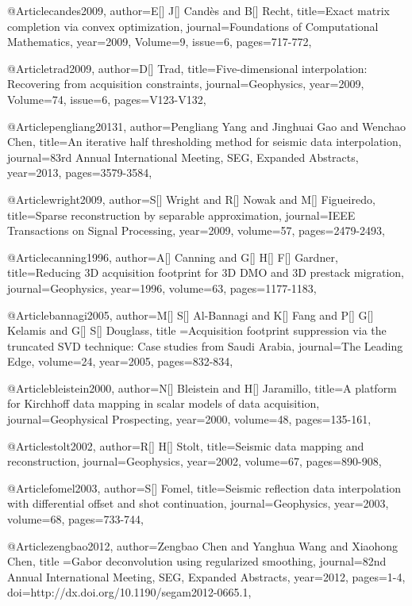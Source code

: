 @Article{candes2009,
  author={E[] J[] Cand\`{e}s and B[] Recht},
  title={Exact matrix completion via convex optimization},
  journal={Foundations of Computational Mathematics},
  year=2009,
  Volume=9,
  issue=6,
  pages={717-772},
}

@Article{trad2009,
  author={D[] Trad},
  title={Five-dimensional interpolation: Recovering from acquisition constraints},
  journal={Geophysics},
  year=2009,
  Volume=74,
  issue=6,
  pages={V123-V132},
}

@Article{pengliang20131,
  author={Pengliang Yang and Jinghuai Gao and Wenchao Chen},
  title={An iterative half thresholding method for seismic data interpolation},
  journal={83rd Annual International Meeting, SEG, Expanded Abstracts},
  year=2013,
  pages={3579-3584},
}

@Article{wright2009,
  author={S[] Wright and R[] Nowak and M[] Figueiredo},
  title={Sparse reconstruction by separable approximation},
  journal={IEEE Transactions on Signal Processing},
  year=2009,
  volume=57,
  pages={2479-2493},
}

@Article{canning1996,
  author={A[] Canning and G[] H[] F[] Gardner},
  title={Reducing 3{D} acquisition footprint for 3{D} DMO and 3{D} prestack migration},
  journal={Geophysics},
  year=1996,
  volume=63,
  pages={1177-1183},
}

@Article{bannagi2005,
  author={M[] S[] Al-Bannagi and K[] Fang and P[] G[] Kelamis and G[] S[] Douglass},
  title ={Acquisition footprint suppression via the truncated SVD technique: Case studies from Saudi Arabia},
  journal={The Leading Edge},
  volume=24,
  year=2005,
  pages={832-834},
}

@Article{bleistein2000,
  author={N[] Bleistein and H[] Jaramillo},
  title={A platform for Kirchhoff data mapping in scalar models of data acquisition},
  journal={Geophysical Prospecting},
  year=2000,
  volume=48,
  pages={135-161},
}

@Article{stolt2002,
  author={R[] H[] Stolt},
  title={Seismic data mapping and reconstruction},
  journal={Geophysics},
  year=2002,
  volume=67,
  pages={890-908},
}


@Article{fomel2003,
  author={S[] Fomel},
  title={Seismic reflection data interpolation with differential offset and shot continuation},
  journal={Geophysics},
  year=2003,
  volume=68,
  pages={733-744},
}

@Article{zengbao2012,
  author={Zengbao Chen and Yanghua Wang and Xiaohong Chen},
  title ={Gabor deconvolution using regularized smoothing},
  journal={82nd Annual International Meeting, SEG, Expanded Abstracts},
  year=2012,
  pages={1-4},
  doi={http://dx.doi.org/10.1190/segam2012-0665.1},
}

